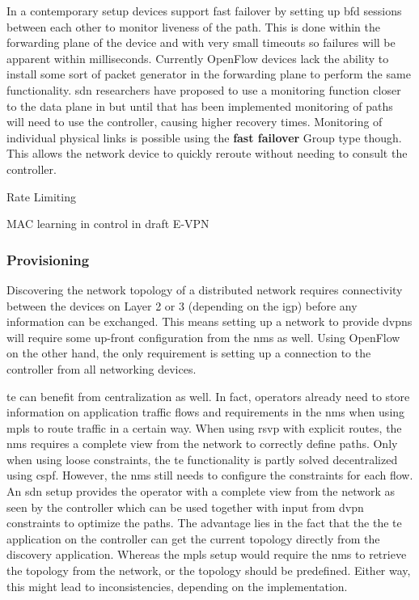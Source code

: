 In a contemporary setup devices support fast failover by setting up \ac{bfd} sessions between each other to monitor liveness of the path. This is done within the forwarding plane of the device and with very small timeouts so failures will be apparent within milliseconds. Currently OpenFlow devices lack the ability to install some sort of packet generator in the forwarding plane to perform the same functionality. \ac{sdn} researchers have proposed to use a monitoring function closer to the data plane in \cite{scalable-fault} but until that has been implemented monitoring of paths will need to use the controller, causing higher recovery times. Monitoring of individual physical links is possible using the \textbf{fast failover} Group type though. This allows the network device to quickly reroute without needing to consult the controller.

Rate Limiting

MAC learning in control in draft E-VPN



\subsubsection{Provisioning} %
\label{ssub:provisioning}

Discovering the network topology of a distributed network requires connectivity between the devices on Layer 2 or 3 (depending on the \ac{igp}) before any information can be exchanged. This means setting up a network to provide \acp{dvpn} will require some up-front configuration from the \ac{nms} as well. Using OpenFlow on the other hand, the only requirement is setting up a connection to the controller from all networking devices. 

\acl{te} can benefit from centralization as well. In fact, operators already need to store information on application traffic flows and requirements in the \ac{nms} when using \ac{mpls} to route traffic in a certain way. When using \ac{rsvp} with explicit routes, the \ac{nms} requires a complete view from the network to correctly define paths. Only when using loose constraints, the \ac{te} functionality is partly solved decentralized using \ac{cspf}. However, the \ac{nms} still needs to configure the constraints for each flow. An \ac{sdn} setup provides the operator with a complete view from the network as seen by the controller which can be used together with input from \ac{dvpn} constraints to optimize the paths. The advantage lies in the fact that the the \ac{te} application on the controller can get the current topology directly from the discovery application. Whereas the \ac{mpls} setup would require the \ac{nms} to retrieve the topology from the network, or the topology should be predefined. Either way, this might lead to inconsistencies, depending on the implementation.


